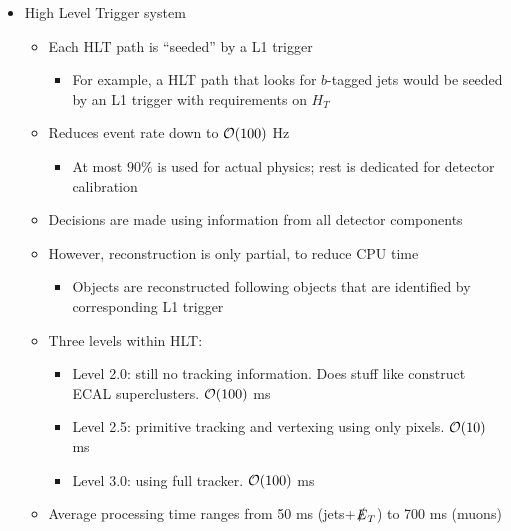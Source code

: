 \begin{itemize}
\begin{itemize}
  \end{itemize}
  \item High Level Trigger system
  \begin{itemize}
    \item Each HLT path is ``seeded'' by a L1 trigger
    \begin{itemize}
      \item For example, a HLT path that looks for $b$-tagged jets would be seeded by an L1 trigger with requirements on $H_T $
    \end{itemize}
    \item Reduces event rate down to $\mathcal{O}(100)$ Hz
    \begin{itemize}
      \item At most $90\%$ is used for actual physics; rest is dedicated for detector calibration
    \end{itemize}
    \item Decisions are made using information from all detector components
    \item However, reconstruction is only partial, to reduce CPU time
    \begin{itemize}
      \item Objects are reconstructed following objects that are identified by corresponding L1 trigger
    \end{itemize}
    \item Three levels within HLT:
    \begin{itemize}
      \item Level 2.0: still no tracking information. Does stuff like construct ECAL superclusters. $\mathcal{O}(100)$ ms
      \item Level 2.5: primitive tracking and vertexing using only pixels. $\mathcal{O}(10)$ ms
      \item Level 3.0: using full tracker. $\mathcal{O}(100)$ ms
    \end{itemize}
    \item Average processing time ranges from 50 ms (jets+$\slashed E_T$) to 700 ms (muons)
  \end{itemize}
\end{itemize}

